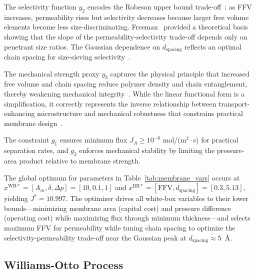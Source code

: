 \documentclass[12pt,a4paper]{article}%
\theoremstyle{plain}%
\theoremstyle{remark}%
\theoremstyle{definition}%
\def\WB{\mathrm{WB}}
\def\BB{\mathrm{BB}}
\begin{document}
\begin{appendices}
The selectivity function $y_2$ encodes the Robeson upper bound trade-off~\cite{robeson1991correlation,robeson2008upper}: as FFV increases, permeability rises but selectivity decreases because larger free volume elements become less size-discriminating. Freeman~\cite{freeman1999basis} provided a theoretical basis showing that the slope of the permeability-selectivity trade-off depends only on penetrant size ratios. The Gaussian dependence on $d_{\text{spacing}}$ reflects an optimal chain spacing for size-sieving selectivity~\cite{park2017maximizing}.

The mechanical strength proxy $y_3$ captures the physical principle that increased free volume and chain spacing reduce polymer density and chain entanglement, thereby weakening mechanical integrity~\cite{bondi1964van}. While the linear functional form is a simplification, it correctly represents the inverse relationship between transport-enhancing microstructure and mechanical robustness that constrains practical membrane design~\cite{chiwaye2025superstructure}.

The constraint $g_1$ ensures minimum flux $J_A \geq 10^{-6}$ mol/(m$^2\cdot$s) for practical separation rates, and $g_2$ enforces mechanical stability by limiting the pressure-area product relative to membrane strength.

The global optimum for parameters in Table~\ref{tab:membrane_vars} occurs at $x^{\WB*} = [A_m, \delta, \Delta p] = [10, 0.1, 1]$ and $x^{\BB*} = [\text{FFV}, d_{\text{spacing}}] = [0.3, 5.13]$, yielding $J^* = 10.997$. The optimizer drives all white-box variables to their lower bounds---minimizing membrane area (capital cost) and pressure difference (operating cost) while maximizing flux through minimum thickness---and selects maximum FFV for permeability while tuning chain spacing to optimize the selectivity-permeability trade-off near the Gaussian peak at $d_{\text{spacing}} \approx 5$~\AA.

\subsection{Williams-Otto Process}\label{subsec:app_williams_otto}


\end{appendices}
\end{document}
